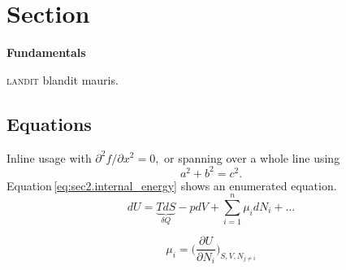 
\section[Fundamentals]{\fontsize{\customSecFontSize}{55}\selectfont Section }
	\vspace{\customSecPreDist}
	\begin{flushleft}
		{\fontsize{\customSecFontSizeAdd}{\customSecLineDistAdd}\selectfont\bfseries Fundamentals\par}
	\end{flushleft}
	\vspace{\customSecPostDist}
	\label{sec:sec2.fundamentals}

	\vspace{\dropCapSecVertDist}\lettrine{\color{\lettrineDropCapFontColor}{B}}{landit} blandit mauris. \blindtext[1]

	\subsection{Equations}

	Inline usage with \( \partial^2 f / \partial x^2 = 0, \) or spanning over a whole line using
	\[ a^2 + b^2 = c^2. \]
	Equation\,\eqref{eq:sec2.internal_energy} shows an enumerated equation.
	\begin{equation}\label{eq:sec2.internal_energy}
		dU = \underbrace{TdS}_{\delta Q} -pdV + \sum_{i = 1}^{n} \mu_i dN_i + \hdots
	\end{equation}

	\begin{equation}
		\mu_i = \Big( \frac{\partial U}{\partial N_i} \Big)_{S, V, N_{j \neq i}}
	\end{equation}

